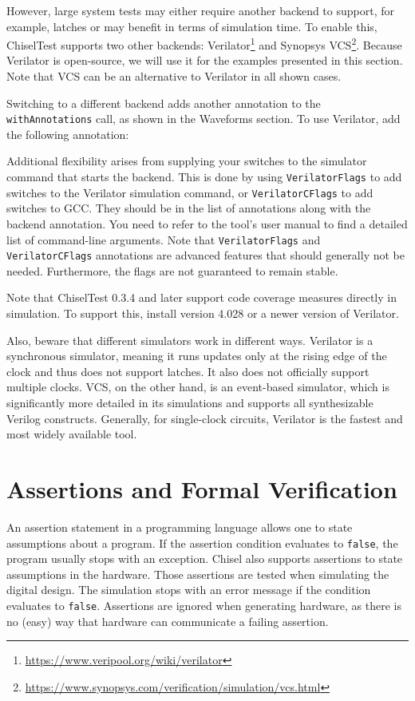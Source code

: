 \documentclass[%
    10pt,
    headinclude, footinclude=false,
    openright, %
    notitlepage,
    cleardoublepage=empty,
    headsepline,
    numbers=noenddot,
    bibliography=totoc, index=totoc,
    ]{scrbook}
\newcommand{\code}[1]{{\lstinline[basicstyle=\small\ttfamily]{#1}}}
\newcommand{\myref}[2]{\href{#1}{#2}}
\renewcommand{\myref}[2]{{#2}{\footnote{\url{#1}}}}
\begin{document}
However, large system tests may either require another backend to support, for example, latches or may
benefit in terms of simulation time. To enable this, ChiselTest supports two other backends:
\myref{https://www.veripool.org/wiki/verilator}{Verilator} and
\myref{https://www.synopsys.com/verification/simulation/vcs.html}{Synopsys VCS}.
Because Verilator is open-source, we will use it for the examples presented in this section.
Note that VCS can be an alternative to Verilator in all shown cases.

Switching to a different backend adds another annotation to the
\code{withAnnotations} call, as shown in the Waveforms section.
To use Verilator, add the following annotation:


Additional flexibility arises from supplying your switches to the
simulator command that starts the backend. This is done by using \code{VerilatorFlags}
to add switches to the Verilator simulation command, or \code{VerilatorCFlags} to add
switches to GCC. They should be in the list of annotations along with the backend
annotation. You need to refer to the tool's user manual to find a detailed list of command-line arguments.
Note that \code{VerilatorFlags} and \code{VerilatorCFlags} annotations are advanced features
that should generally not be needed. Furthermore, the flags are not guaranteed to remain stable.

Note that ChiselTest 0.3.4 and later support code coverage measures directly in simulation.
To support this, install version 4.028 or a newer version of Verilator.

Also, beware that different simulators work in different ways. Verilator is a
synchronous simulator, meaning it runs updates only at the rising edge of the
clock and thus does not support latches. It also does not officially support multiple
clocks. VCS, on the other hand, is an event-based simulator, which is significantly more
detailed in its simulations and supports all synthesizable Verilog constructs.
Generally, for single-clock circuits, Verilator is the fastest and
most widely available tool.

\section{Assertions and Formal Verification}

An assertion statement in a programming language allows one to state assumptions about a program.
If the assertion condition evaluates to \code{false}, the program usually stops with an exception.
Chisel also supports assertions to state assumptions in the hardware. Those assertions are tested
when simulating the digital design. The simulation stops with an error message if the condition evaluates to \code{false}. Assertions are ignored when generating hardware, as there is no (easy) way that
hardware can communicate a failing assertion.
\end{document}
